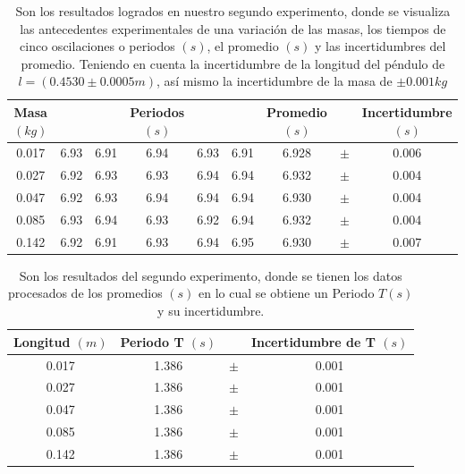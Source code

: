 \documentclass[10pt,a4paper]{article}
\begin{document}
\begin{table}[ht]
	\centering
	\begin{tabular}{c c c c c c c c c}
		
		\hline\hline 
		
		Masa $(kg)$ & & & Periodos $(s)$& &  & Promedio $(s)$  & & Incertidumbre $(s)$  \\		
		\hline\hline	
		
		0.017&6.93&6.91&6.94&6.93&6.91&6.928&$\pm$& 0.006\\
		0.027&6.92&6.93&6.93&6.94&6.94&6.932&$\pm$& 0.004\\ 
		0.047&6.92&6.93&6.94&6.94&6.94&6.930&$\pm$& 0.004\\
		0.085&6.93&6.94&6.93&6.92&6.94&6.932&$\pm$& 0.004\\
		0.142&6.92&6.91&6.93&6.94&6.95&6.930&$\pm$& 0.007\\ [0.5ex]
		\hline	
	\end{tabular}
	\caption{Son los resultados logrados en nuestro segundo experimento, donde se visualiza las antecedentes experimentales de una variación de las masas, los tiempos de cinco oscilaciones o periodos $(s)$, el promedio $(s)$ y las incertidumbres del promedio. Teniendo en cuenta la incertidumbre de la longitud del péndulo de $ l= (0.4530\pm 0.0005m)$, así mismo la incertidumbre de la masa de $ \pm 0.001kg$}
	\label{tabla de longitudes_2}
	
\end{table}

\begin{table}[ht]
	\centering
	\begin{tabular}{c c c c}
		
		\hline\hline 
		
		Longitud $(m)$ & Periodo T  $(s)$& &  Incertidumbre de T $(s)$ \\ 
		
		\hline\hline	
		
		0.017&1.386&$\pm$&0.001\\
		0.027&1.386&$\pm$&0.001\\
		0.047&1.386&$\pm$&0.001\\
		0.085&1.386&$\pm$&0.001\\
		0.142&1.386&$\pm$&0.001\\ [0.5ex]
		\hline	
	\end{tabular}
	\caption{Son los resultados del segundo experimento, donde se tienen los datos procesados de los promedios $(s)$ en lo cual se obtiene un Periodo $T(s)$ y su incertidumbre.}
	\label{tabla de longitudes procesado_2}
\end{table}
\end{document}
